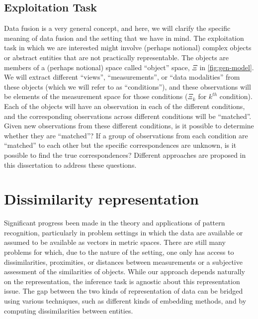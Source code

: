 \documentclass[12pt,oneside,final]{thesis}\usepackage[]{graphicx}\usepackage[]{color}
\begin{document}
\subsection{Exploitation Task\label{subsec:expl_task}}
Data fusion is a very general concept, and here, we will clarify the specific meaning of data fusion and the setting that we have in mind.  The exploitation task in which we are interested might involve (perhaps notional) complex objects or abstract entities that are not practically representable. The objects are members of a (perhaps notional) space called ``object'' space, $\Xi$ in \autoref{fig:gen-model}. We will extract different ``views'', ``measurements'', or ``data modalities'' from these objects (which we will refer to as ``conditions''), and these observations will be elements of the measurement space for those conditions ($\Xi_k$ for $k^{th}$ condition). Each  of the objects will have an observation in each of the different conditions, and the corresponding observations across different conditions will be ``matched''. Given new observations from these different conditions, is it possible
 to determine whether they are ``matched''? If a group of  observations from each condition are ``matched'' to each other but the specific correspondences are unknown, is it possible to find the true correspondences? Different approaches are proposed in this dissertation to address these questions.
\label{subsec:task}



\section{Dissimilarity representation\label{sec:dissim_repr}}
 Significant progress been made in the theory and applications of pattern recognition, particularly in problem settings in which the data are available or assumed to be available as vectors in metric spaces. There are still many problems for which, due to the nature of the setting, one only has access to dissimilarities, proximities, or distances between measurements or a subjective assessment  of the similarities of objects.  While our approach depends naturally on the representation, the inference task is agnostic about this representation issue. The gap between the two kinds of representation of data can be bridged using various  techniques, such as different kinds of embedding methods, and by computing dissimilarities between entities.
\end{document}
